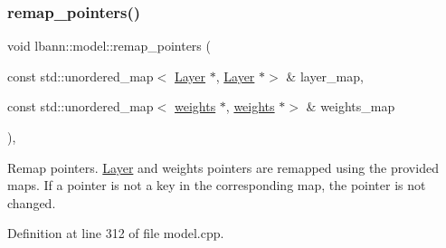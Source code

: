 \subsubsection{\texorpdfstring{remap\+\_\+pointers()}{remap\_pointers()}}
{\footnotesize\ttfamily void lbann\+::model\+::remap\+\_\+pointers (\begin{DoxyParamCaption}\item[{const std\+::unordered\+\_\+map$<$ \hyperlink{classlbann_1_1Layer}{Layer} $\ast$, \hyperlink{classlbann_1_1Layer}{Layer} $\ast$$>$ \&}]{layer\+\_\+map,  }\item[{const std\+::unordered\+\_\+map$<$ \hyperlink{classlbann_1_1weights}{weights} $\ast$, \hyperlink{classlbann_1_1weights}{weights} $\ast$$>$ \&}]{weights\+\_\+map }\end{DoxyParamCaption})\hspace{0.3cm}{\ttfamily [protected]}, {\ttfamily [virtual]}}

Remap pointers. \hyperlink{classlbann_1_1Layer}{Layer} and weights pointers are remapped using the provided maps. If a pointer is not a key in the corresponding map, the pointer is not changed. 

Definition at line 312 of file model.\+cpp.


